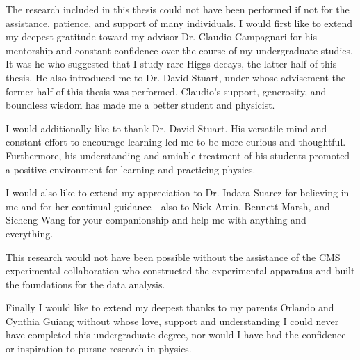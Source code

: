 \begin{acknowledgements}

The research included in this thesis could not have been performed if not for the assistance, patience, and support of many individuals.  I would first like to extend my deepest gratitude toward my advisor Dr. Claudio Campagnari for his mentorship and constant confidence over the course of my undergraduate studies. It was he who suggested that I study rare Higgs decays, the latter half of this thesis. He also introduced me to Dr. David Stuart, under whose advisement the former half of this thesis was performed. Claudio's support, generosity, and boundless wisdom has made me a better student and physicist.

I would additionally like to thank Dr. David Stuart. His versatile mind and constant effort to encourage learning led me to be more curious and thoughtful. Furthermore, his understanding and amiable treatment of his students promoted a positive environment for learning and practicing physics.

I would also like to extend my appreciation to Dr. Indara Suarez for believing in me and for her continual guidance - also to Nick Amin, Bennett Marsh, and Sicheng Wang for your companionship and help me with anything and everything.

This research would not have been possible without the assistance of the CMS experimental collaboration who constructed the experimental apparatus and built the foundations for the data analysis.  

Finally I would like to extend my deepest thanks to my parents Orlando and Cynthia Guiang without whose love, support and understanding I could never have completed this undergraduate degree, nor would I have had the confidence or inspiration to pursue research in physics.

\end{acknowledgements} 
